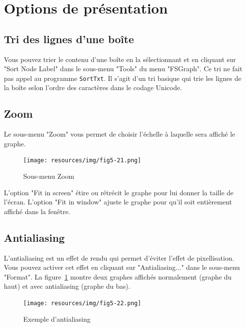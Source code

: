 


\section{Options de présentation}

\subsection{Tri des lignes d’une boîte}
Vous pouvez trier le contenu d’une boîte en la sélectionnant et en cliquant sur "Sort Node
Label" dans le sous-menu "Tools" du menu "FSGraph". Ce tri ne fait pas appel au programme
\verb+SortTxt+. Il s’agit d’un tri basique qui trie les lignes de la boîte selon l’ordre des
caractères dans le codage Unicode.


\subsection{Zoom}
Le sous-menu "Zoom" vous permet de choisir l’échelle à laquelle sera affiché le graphe.

\bigskip
\begin{figure}[!ht]
\begin{center}
\texttt{[image: resources/img/fig5-21.png]}
\caption{Sous-menu Zoom}
\end{center}
\end{figure}

\noindent L’option "Fit in screen" étire ou rétrécit le graphe pour lui donner la taille de l’écran.
L’option "Fit in window" ajuste le graphe pour qu’il soit entièrement affiché dans la fenêtre.


\subsection{Antialiasing}
L’antialiasing est un effet de rendu qui permet d’éviter l’effet de pixellisation.
 Vous pouvez activer cet effet en cliquant sur "Antialiasing..."
dans le sous-menu "Format". La figure~\ref{fig-antialiasing} montre deux graphes affichés
normalement (graphe du haut) et avec antialiasing (graphe du bas).


\bigskip
\begin{figure}[!ht]
\begin{center}
\texttt{[image: resources/img/fig5-22.png]}
\caption{Exemple d'antialiasing\label{fig-antialiasing}}
\end{center}
\end{figure}

